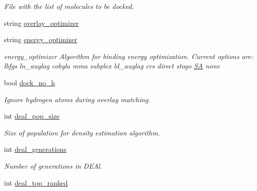 \begin{DoxyCompactItemize}
\begin{DoxyCompactList}\small\item\em File with the list of molecules to be docked. \item\end{DoxyCompactList}\item 
string \hyperlink{classPARSER_aeb177596ca3ca3cb2910a8ba3fe2c77e}{overlay\_\-optimizer}
\item 
\hypertarget{classPARSER_aa626d0b28618ee4828aad8d929dd091a}{
string \hyperlink{classPARSER_aa626d0b28618ee4828aad8d929dd091a}{energy\_\-optimizer}}
\label{classPARSER_aa626d0b28618ee4828aad8d929dd091a}

\begin{DoxyCompactList}\small\item\em energy\_\-optimizer Algorithm for binding energy optimization. Current options are: lbfgs ln\_\-auglag cobyla mma subplex ld\_\-auglag crs direct stogo \hyperlink{classSA}{SA} none \item\end{DoxyCompactList}\item 
\hypertarget{classPARSER_a472ad18b44b688211ba5c3bac207d733}{
bool \hyperlink{classPARSER_a472ad18b44b688211ba5c3bac207d733}{dock\_\-no\_\-h}}
\label{classPARSER_a472ad18b44b688211ba5c3bac207d733}

\begin{DoxyCompactList}\small\item\em Ignore hydrogen atoms during overlay matching. \item\end{DoxyCompactList}\item 
\hypertarget{classPARSER_afe06b419ab83ef6d8541b783f7cafe8f}{
int \hyperlink{classPARSER_afe06b419ab83ef6d8541b783f7cafe8f}{deal\_\-pop\_\-size}}
\label{classPARSER_afe06b419ab83ef6d8541b783f7cafe8f}

\begin{DoxyCompactList}\small\item\em Size of population for density estimation algorithm. \item\end{DoxyCompactList}\item 
\hypertarget{classPARSER_a5e7edda0485ddf3bd64af16de70a5a47}{
int \hyperlink{classPARSER_a5e7edda0485ddf3bd64af16de70a5a47}{deal\_\-generations}}
\label{classPARSER_a5e7edda0485ddf3bd64af16de70a5a47}

\begin{DoxyCompactList}\small\item\em Number of generations in DEAl. \item\end{DoxyCompactList}\item 
\hypertarget{classPARSER_a1261a027aee173c44fd780a1e99b92d9}{
int \hyperlink{classPARSER_a1261a027aee173c44fd780a1e99b92d9}{deal\_\-top\_\-ranked}}
\label{classPARSER_a1261a027aee173c44fd780a1e99b92d9}


\end{DoxyCompactItemize}
